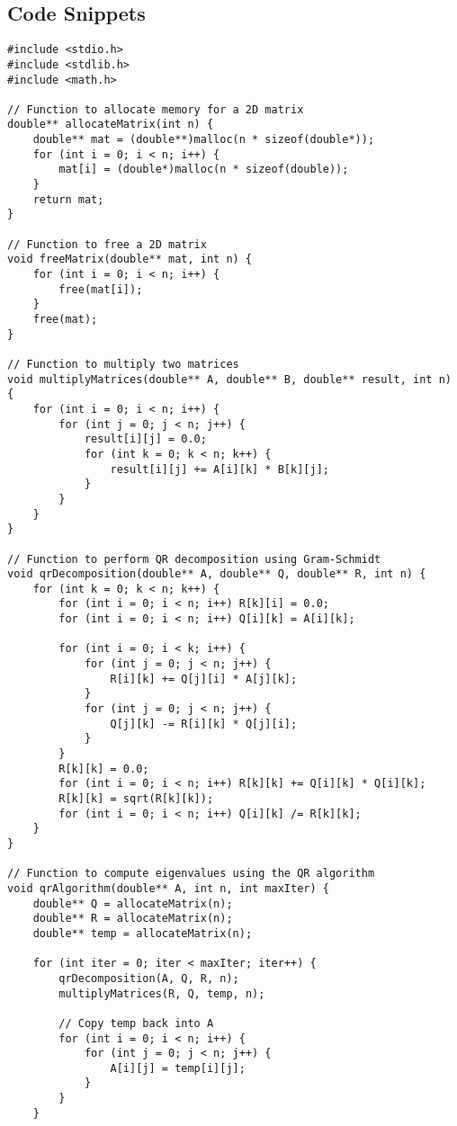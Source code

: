 \documentclass[journal]{IEEEtran}
\begin{document}
\subsection{Code Snippets}
\lstset{language=C, basicstyle=\ttfamily\small, breaklines=true, frame=single, captionpos=b}

\begin{lstlisting}[caption={C code}]
#include <stdio.h>
#include <stdlib.h>
#include <math.h>

// Function to allocate memory for a 2D matrix
double** allocateMatrix(int n) {
    double** mat = (double**)malloc(n * sizeof(double*));
    for (int i = 0; i < n; i++) {
        mat[i] = (double*)malloc(n * sizeof(double));
    }
    return mat;
}

// Function to free a 2D matrix
void freeMatrix(double** mat, int n) {
    for (int i = 0; i < n; i++) {
        free(mat[i]);
    }
    free(mat);
}

// Function to multiply two matrices
void multiplyMatrices(double** A, double** B, double** result, int n) {
    for (int i = 0; i < n; i++) {
        for (int j = 0; j < n; j++) {
            result[i][j] = 0.0;
            for (int k = 0; k < n; k++) {
                result[i][j] += A[i][k] * B[k][j];
            }
        }
    }
}

// Function to perform QR decomposition using Gram-Schmidt
void qrDecomposition(double** A, double** Q, double** R, int n) {
    for (int k = 0; k < n; k++) {
        for (int i = 0; i < n; i++) R[k][i] = 0.0;
        for (int i = 0; i < n; i++) Q[i][k] = A[i][k];

        for (int i = 0; i < k; i++) {
            for (int j = 0; j < n; j++) {
                R[i][k] += Q[j][i] * A[j][k];
            }
            for (int j = 0; j < n; j++) {
                Q[j][k] -= R[i][k] * Q[j][i];
            }
        }
        R[k][k] = 0.0;
        for (int i = 0; i < n; i++) R[k][k] += Q[i][k] * Q[i][k];
        R[k][k] = sqrt(R[k][k]);
        for (int i = 0; i < n; i++) Q[i][k] /= R[k][k];
    }
}

// Function to compute eigenvalues using the QR algorithm
void qrAlgorithm(double** A, int n, int maxIter) {
    double** Q = allocateMatrix(n);
    double** R = allocateMatrix(n);
    double** temp = allocateMatrix(n);

    for (int iter = 0; iter < maxIter; iter++) {
        qrDecomposition(A, Q, R, n);
        multiplyMatrices(R, Q, temp, n);

        // Copy temp back into A
        for (int i = 0; i < n; i++) {
            for (int j = 0; j < n; j++) {
                A[i][j] = temp[i][j];
            }
        }
    }


\end{lstlisting}
\end{document}
